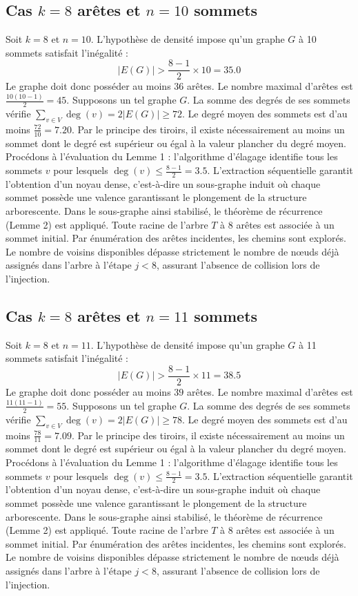 \documentclass[12pt,a4paper]{article}
\begin{document}
\subsection{Cas $k = 8$ arêtes et $n = 10$ sommets}
Soit $k = 8$ et $n = 10$. L'hypothèse de densité impose qu'un graphe $G$ à 10 sommets satisfait l'inégalité :
$$ |E(G)| > \frac{8-1}{2} \times 10 = 35.0 $$
Le graphe doit donc posséder au moins $36$ arêtes. Le nombre maximal d'arêtes est $\frac{10(10-1)}{2} = 45$.
Supposons un tel graphe $G$. La somme des degrés de ses sommets vérifie $\sum_{v \in V} \deg(v) = 2|E(G)| \geq 72$.
Le degré moyen des sommets est d'au moins $\frac{72}{10} = 7.20$.
Par le principe des tiroirs, il existe nécessairement au moins un sommet dont le degré est supérieur ou égal à la valeur plancher du degré moyen.
Procédons à l'évaluation du Lemme 1 : l'algorithme d'élagage identifie tous les sommets $v$ pour lesquels $\deg(v) \leq \frac{8-1}{2} = 3.5$.
L'extraction séquentielle garantit l'obtention d'un noyau dense, c'est-à-dire un sous-graphe induit où chaque sommet possède une valence garantissant le plongement de la structure arborescente.
Dans le sous-graphe ainsi stabilisé, le théorème de récurrence (Lemme 2) est appliqué. Toute racine de l'arbre $T$ à 8 arêtes est associée à un sommet initial. Par énumération des arêtes incidentes, les chemins sont explorés. Le nombre de voisins disponibles dépasse strictement le nombre de nœuds déjà assignés dans l'arbre à l'étape $j < 8$, assurant l'absence de collision lors de l'injection.

\subsection{Cas $k = 8$ arêtes et $n = 11$ sommets}
Soit $k = 8$ et $n = 11$. L'hypothèse de densité impose qu'un graphe $G$ à 11 sommets satisfait l'inégalité :
$$ |E(G)| > \frac{8-1}{2} \times 11 = 38.5 $$
Le graphe doit donc posséder au moins $39$ arêtes. Le nombre maximal d'arêtes est $\frac{11(11-1)}{2} = 55$.
Supposons un tel graphe $G$. La somme des degrés de ses sommets vérifie $\sum_{v \in V} \deg(v) = 2|E(G)| \geq 78$.
Le degré moyen des sommets est d'au moins $\frac{78}{11} = 7.09$.
Par le principe des tiroirs, il existe nécessairement au moins un sommet dont le degré est supérieur ou égal à la valeur plancher du degré moyen.
Procédons à l'évaluation du Lemme 1 : l'algorithme d'élagage identifie tous les sommets $v$ pour lesquels $\deg(v) \leq \frac{8-1}{2} = 3.5$.
L'extraction séquentielle garantit l'obtention d'un noyau dense, c'est-à-dire un sous-graphe induit où chaque sommet possède une valence garantissant le plongement de la structure arborescente.
Dans le sous-graphe ainsi stabilisé, le théorème de récurrence (Lemme 2) est appliqué. Toute racine de l'arbre $T$ à 8 arêtes est associée à un sommet initial. Par énumération des arêtes incidentes, les chemins sont explorés. Le nombre de voisins disponibles dépasse strictement le nombre de nœuds déjà assignés dans l'arbre à l'étape $j < 8$, assurant l'absence de collision lors de l'injection.
\end{document}
